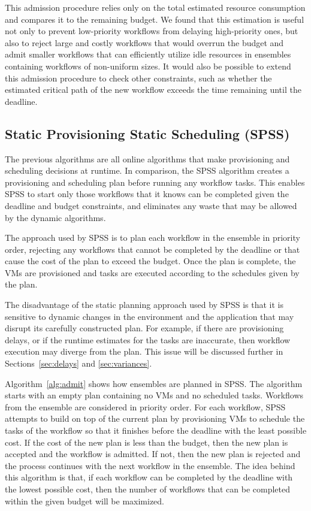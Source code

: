 \documentclass[conference]{IEEEtran}
\begin{document}
This admission procedure relies only on the total estimated resource consumption and compares it to the remaining budget. We found that this estimation is useful not only to prevent low-priority workflows from delaying high-priority ones, but also to reject large and costly workflows that would overrun the budget and admit smaller workflows that can efficiently utilize idle resources in ensembles containing workflows of non-uniform sizes. It would also be possible to extend this admission procedure to check other constraints, such as whether the estimated critical path of the new workflow exceeds the time remaining until the deadline.


\subsection{Static Provisioning Static Scheduling (SPSS)}

The previous algorithms are all online algorithms that make provisioning and scheduling decisions at runtime. In comparison, the SPSS algorithm creates a provisioning and scheduling plan before running any workflow tasks. This enables SPSS to start only those workflows that it knows can be completed given the deadline and budget constraints, and eliminates any waste that may be allowed by the dynamic algorithms.

The approach used by SPSS is to plan each workflow in the ensemble in priority order, rejecting any workflows that cannot be completed by the deadline or that cause the cost of the plan to exceed the budget. Once the plan is complete, the VMs are provisioned and tasks are executed according to the schedules given by the plan.

The disadvantage of the static planning approach used by SPSS is that it is sensitive to dynamic changes in the environment and the application that may disrupt its carefully constructed plan. For example, if there are provisioning delays, or if the runtime estimates for the tasks are inaccurate, then workflow execution may diverge from the plan. This issue will be discussed further in Sections~\ref{sec:delays} and \ref{sec:variances}.

Algorithm~\ref{alg:admit} shows how ensembles are planned in SPSS. The algorithm starts with an empty plan containing no VMs and no scheduled tasks. Workflows from the ensemble are considered in priority order. For each workflow, SPSS attempts to build on top of the current plan by provisioning VMs to schedule the tasks of the workflow so that it finishes before the deadline with the least possible cost. If the cost of the new plan is less than the budget, then the new plan is accepted and the workflow is admitted. If not, then the new plan is rejected and the process continues with the next workflow in the ensemble. The idea behind this algorithm is that, if each workflow can be completed by the deadline with the lowest possible cost, then the number of workflows that can be completed within the given budget will be maximized.
\end{document}
